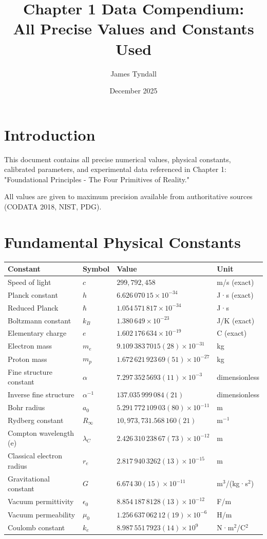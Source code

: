 \documentclass{article}
\title{Chapter 1 Data Compendium:\\All Precise Values and Constants Used}
\author{James Tyndall}
\date{December 2025}
\begin{document}
\maketitle

\section{Introduction}

This document contains all precise numerical values, physical constants, calibrated parameters, and experimental data referenced in Chapter 1: "Foundational Principles - The Four Primitives of Reality."

All values are given to maximum precision available from authoritative sources (CODATA 2018, NIST, PDG).

\section{Fundamental Physical Constants}

\begin{longtable}{llll}
\toprule
\textbf{Constant} & \textbf{Symbol} & \textbf{Value} & \textbf{Unit} \\
\midrule
Speed of light & $c$ & $299{,}792{,}458$ & m/s (exact) \\
Planck constant & $h$ & $6.626\,070\,15 \times 10^{-34}$ & J·s (exact) \\
Reduced Planck & $\hbar$ & $1.054\,571\,817 \times 10^{-34}$ & J·s \\
Boltzmann constant & $k_B$ & $1.380\,649 \times 10^{-23}$ & J/K (exact) \\
Elementary charge & $e$ & $1.602\,176\,634 \times 10^{-19}$ & C (exact) \\
Electron mass & $m_e$ & $9.109\,383\,7015(28) \times 10^{-31}$ & kg \\
Proton mass & $m_p$ & $1.672\,621\,923\,69(51) \times 10^{-27}$ & kg \\
Fine structure constant & $\alpha$ & $7.297\,352\,5693(11) \times 10^{-3}$ & dimensionless \\
Inverse fine structure & $\alpha^{-1}$ & $137.035\,999\,084(21)$ & dimensionless \\
Bohr radius & $a_0$ & $5.291\,772\,109\,03(80) \times 10^{-11}$ & m \\
Rydberg constant & $R_\infty$ & $10{,}973{,}731.568\,160(21)$ & m$^{-1}$ \\
Compton wavelength (e) & $\lambda_C$ & $2.426\,310\,238\,67(73) \times 10^{-12}$ & m \\
Classical electron radius & $r_e$ & $2.817\,940\,3262(13) \times 10^{-15}$ & m \\
Gravitational constant & $G$ & $6.674\,30(15) \times 10^{-11}$ & m$^3$/(kg·s$^2$) \\
Vacuum permittivity & $\epsilon_0$ & $8.854\,187\,8128(13) \times 10^{-12}$ & F/m \\
Vacuum permeability & $\mu_0$ & $1.256\,637\,062\,12(19) \times 10^{-6}$ & H/m \\
Coulomb constant & $k_e$ & $8.987\,551\,7923(14) \times 10^{9}$ & N·m$^2$/C$^2$ \\
\bottomrule
\end{longtable}
\end{document}
